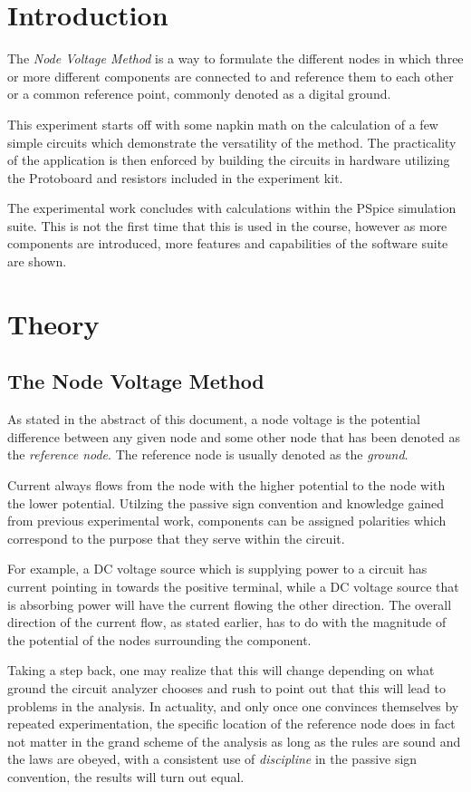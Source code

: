 \documentclass[12pt]{article}
\begin{document}
\section{Introduction}
The \textit{Node Voltage Method} is a way to formulate the different nodes in
which three or more different components are connected to and reference them to
each other or a common reference point, commonly denoted as a digital ground.

This experiment starts off with some napkin math on the calculation of a few
simple circuits which demonstrate the versatility of the method. The
practicality of the application is then enforced by building the circuits in
hardware utilizing the Protoboard and resistors included in the experiment kit.

The experimental work concludes with calculations within the PSpice simulation
suite. This is not the first time that this is used in the course, however as
more components are introduced, more features and capabilities of the software
suite are shown.
\section{Theory}
\subsection{The Node Voltage Method}
As stated in the abstract of this document, a node voltage is the potential
difference between any given node and some other node that has been denoted as
the \textit{reference node}. The reference node is usually denoted as the
\textit{ground}.

Current always flows from the node with the higher potential to the node with
the lower potential. Utilzing the passive sign convention and knowledge gained
from previous experimental work, components can be assigned polarities which
correspond to the purpose that they serve within the circuit.

For example, a DC voltage source which is supplying power to a circuit has
current pointing in towards the positive terminal, while a DC voltage source
that is absorbing power will have the current flowing the other direction. The
overall direction of the current flow, as stated earlier, has to do with the
magnitude of the potential of the nodes surrounding the component.

Taking a step back, one may realize that this will change depending on what
ground the circuit analyzer chooses and rush to point out that this will lead to
problems in the analysis. In actuality, and only once one convinces themselves
by repeated experimentation, the specific location of the reference node does in
fact not matter in the grand scheme of the analysis as long as the rules are sound
and the laws are obeyed, with a consistent use of \textit{discipline} in the
passive sign convention, the results will turn out equal.
\end{document}
